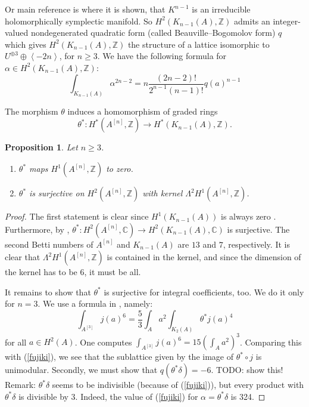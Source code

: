 \documentclass{amsart}
\newcommand{\hilb}[1]{^{[#1]}}
\newcommand{\kum}[2]{K_{ #2 }( #1 )}
\newcommand{\C}{\mathbb{C}}
\newcommand{\Z}{\mathbb{Z}}
\theoremstyle{plain}
\newtheorem{proposition}[theorem]{Proposition}
\theoremstyle{definition}
\theoremstyle{remark}
\begin{document}
Or main reference is \cite{Beauville} where it is shown, that $K^{n-1}$ is an irreducible holomorphically symplectic manifold. So $H^2(\kum{A}{n-1},\Z)$ admits an integer-valued nondegenerated quadratic form (called Beauville--Bogomolov form) $q$ which gives $H^2(\kum{A}{n-1},\Z)$ the structure of a lattice isomorphic to $U^{\oplus 3}\oplus \left< -2n \right>$, for $n\geq 3$. We have the following formula for $\alpha\in H^2(\kum{A}{n-1},\Z)$:
\begin{equation} \label{fujiki}
\int_{\kum{A}{n-1}} \alpha^{2n-2} = n\frac{(2n-2)!}{2^{n-1}(n-1)!} q(a)^{n-1}
\end{equation}


The morphism $\theta$ induces a homomorphism of graded rings
\begin{equation}
\theta^* :H^*(A\hilb{n},\Z)\longrightarrow H^*(\kum{A}{n-1},\Z).
\end{equation}

\begin{proposition}Let $n\geq 3$.
\begin{enumerate} 
 \item $\theta^*$ maps $H^1(A\hilb{n},\Z)$ to zero.
 \item $\theta^*$ is surjective on $H^2(A\hilb{n},\Z)$ with kernel $\Lambda^2H^1(A\hilb{n},\Z)$.
\end{enumerate}
\end{proposition}
\begin{proof}
The first statement is clear since $H^1(\kum{A}{n-1})$ is always zero \cite[Thm.~3]{Beauville}. Furthermore, by \cite[Sect.~7]{Beauville}, $\theta^{\ast} : H^2(A\hilb{n},\C) \rightarrow H^2(\kum{A}{n-1},\C)$ is surjective. The second Betti numbers of $A\hilb{n}$ and $\kum{A}{n-1}$ are $13$ and $7$, respectively. It is clear that $\Lambda^2H^1(A\hilb{n},\Z)$ is contained in the kernel, and since the dimension of the kernel has to be $6$, it must be all.

It remains to show that $\theta^*$  is surjective for integral coefficients, too. We do it only for $n=3$. We use a formula in \cite[p. 8]{Britze}, namely:
\begin{equation} \int_{A\hilb{3}}j(a)^6 = \frac{5}{3} \int_A a^2 \int_{\kum{A}{2}} \theta^* j(a)^4
\end{equation}
for all $a\in H^2(A)$. One computes $\int_{A\hilb{3}}j(a)^6 = 15 \left(\int_A a^2\right)^3$. Comparing this with (\ref{fujiki}), we see that the sublattice given by the image of $\theta^*\circ j$ is unimodular. Secondly, we must show that $q(\theta^*\delta) = -6$. TODO: show this! 
Remark: $\theta^*\delta$ seems to be indivisible (because of (\ref{fujiki})), but every product with $\theta^*\delta$ is divisible by 3. Indeed, the value of (\ref{fujiki}) for $\alpha=\theta^*\delta$ is 324.
\end{proof}
\end{document}
